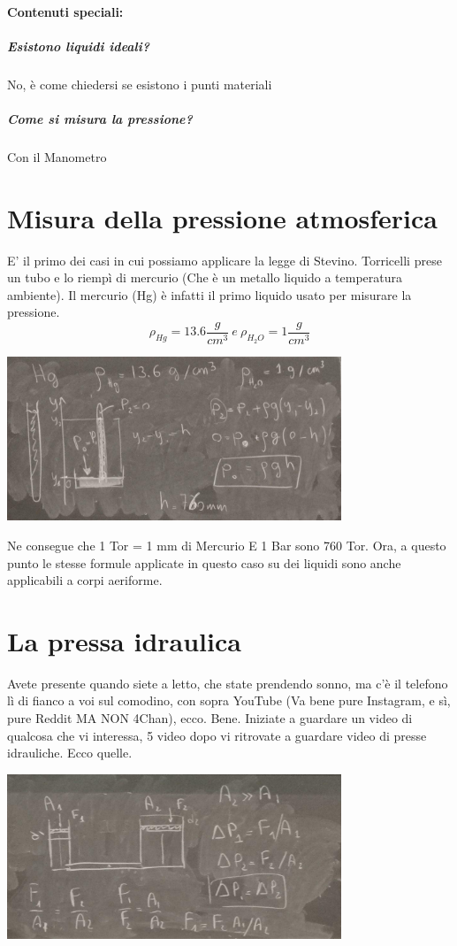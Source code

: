 \documentclass[12pt, a4paper, openany, oneside]{book}
\begin{document}
\paragraph{Contenuti speciali:}
\subparagraph{Esistono liquidi ideali? }No, è come chiedersi se esistono i punti
materiali
\subparagraph{Come si misura la pressione? }Con il Manometro
\section{Misura della pressione atmosferica}
E' il primo dei casi in cui possiamo applicare la legge di Stevino. Torricelli 
prese un tubo e lo riempì di mercurio (Che è un metallo liquido a temperatura 
ambiente). 
Il mercurio (Hg) è infatti il primo liquido usato per misurare la pressione. 
\[
\rho_{Hg} = 13.6 \frac{g}{cm^{3}} ~ e ~ \rho_{H_{2}O} = 1 \frac{g}{cm^{3}}
\]
\begin{center}
\includegraphics[width=0.75\textwidth]{7}
\end{center}
Ne consegue che 1 Tor = 1 mm di Mercurio E 1 Bar sono 760 Tor.
Ora, a questo punto le stesse formule applicate in questo caso su dei liquidi
sono anche applicabili a corpi aeriforme. 
\section{La pressa idraulica}
Avete presente quando siete a letto, che state prendendo sonno, ma c'è il telefono
lì di fianco a voi sul comodino, con sopra YouTube (Va bene pure Instagram, e sì,
pure Reddit MA NON 4Chan), 
ecco. Bene. Iniziate
a guardare un video di qualcosa che vi interessa, 5 video dopo vi ritrovate a 
guardare video di presse idrauliche. Ecco quelle.
\begin{center}
\includegraphics[width=0.75\textwidth]{8}
\end{center}
\end{document}
